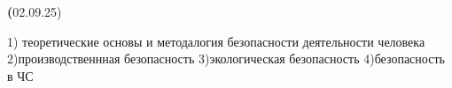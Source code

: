 \documentclass[14pt, a4paper]{extarticle}
\begin{document}
\textbf(02.09.25)

1) теоретические основы и методалогия безопасности деятельности человека
2)производственнная безопасность
3)экологическая безопасность
4)безопасность в ЧС
\end{document}
